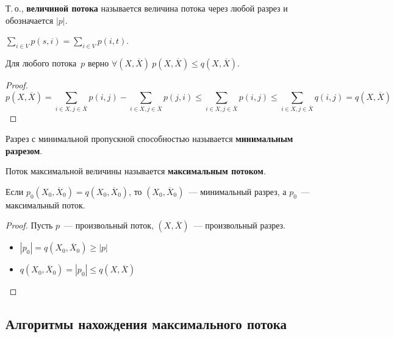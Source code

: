 Т.\,о., \textbf{величиной потока} называется величина потока через любой разрез и обозначается $|p|$.

\begin{consequent}
$\sum\limits_{i \in V} p(s, i) = \sum\limits_{i \in V} p(i, t)$.
\end{consequent}

\begin{lemma}
Для любого потока~$p$ верно $\forall (X, \overline X) \ p(X, \overline X) \leqslant q(X, \overline X)$.
\end{lemma}
\begin{proof}
\begin{equation*}
p(X, \overline X) =
\sum_{i \in X, j \in \overline X} p(i, j) - \sum_{i \in X, j \in \overline X} p(j, i) \leqslant
\sum_{i \in X, j \in \overline X} p(i, j) \leqslant
\sum_{i \in X, j \in \overline X} q(i, j) =
q(X, \overline X)
\end{equation*}
\end{proof}

Разрез с минимальной пропускной способностью называется \textbf{минимальным разрезом}.

Поток максимальной величины называется \textbf{максимальным потоком}.

\begin{lemma}
Если $p_0(X_0, \overline X_0) = q(X_0, \overline X_0)$, то $(X_0, \overline X_0)$~--- минимальный разрез, а $p_0$~--- максимальный поток.
\end{lemma}
\begin{proof}
Пусть $p$~--- произвольный поток, $(X, \overline X)$~--- произвольный разрез.
\begin{itemize}
	\item $|p_0| = q(X_0, \overline X_0) \geqslant |p|$
	\item $q(X_0, \overline X_0) = |p_0| \leqslant q(X, \overline X)$
\end{itemize}
\end{proof}

\subsection{Алгоритмы нахождения максимального потока}
